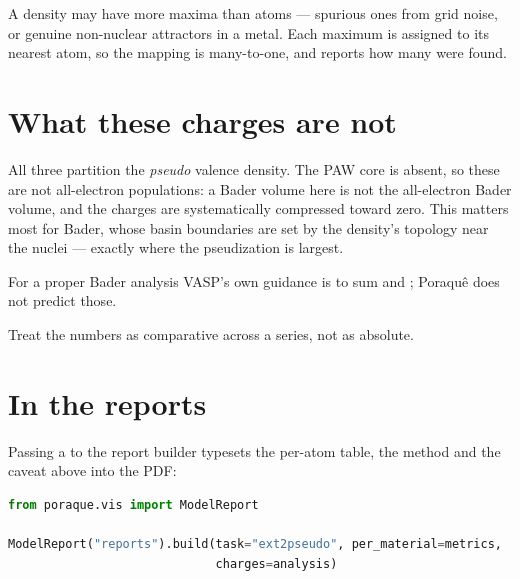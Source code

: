 A density may have more maxima than atoms --- spurious ones from grid noise, or
genuine non-nuclear attractors in a metal. Each maximum is assigned to its
nearest atom, so the mapping is many-to-one, and 
reports how many were found.

\section{What these charges are not}

\begin{pwarn}
All three partition the \emph{pseudo} valence density. The PAW core is absent,
so these are not all-electron populations: a Bader volume here is not the
all-electron Bader volume, and the charges are systematically compressed toward
zero. This matters most for Bader, whose basin boundaries are set by the
density's topology near the nuclei --- exactly where the pseudization is
largest.

For a proper Bader analysis VASP's own guidance is to sum  and
; Poraqu\^e does not predict those.

Treat the numbers as comparative across a series, not as absolute.
\end{pwarn}

\section{In the reports}

Passing a  to the report builder typesets the per-atom
table, the method and the caveat above into the PDF:

\begin{lstlisting}[language=Python]
from poraque.vis import ModelReport

ModelReport("reports").build(task="ext2pseudo", per_material=metrics,
                             charges=analysis)
\end{lstlisting}
